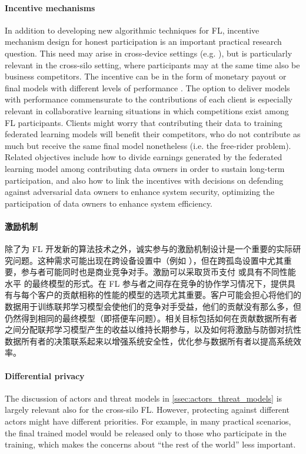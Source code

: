 \paragraph{Incentive mechanisms} In addition to developing new algorithmic techniques for FL, incentive mechanism design for honest participation is an important practical research question. This need may arise in cross-device settings (e.g. \citep{kang19incentive,kang2019incentiveB}), but is particularly relevant in the cross-silo setting, where participants may at the same time also be business competitors. The incentive can be in the form of monetary payout \citep{Yu-et-al:2020IS} or final models with different levels of performance \citep{Lyu-et-al:2020TPDS}. The option to deliver models with performance commensurate to the contributions of each client is especially relevant in collaborative learning situations in which competitions exist among FL participants. Clients might worry that contributing their data to training federated learning models will benefit their competitors, who do not contribute as much but receive the same final model nonetheless (i.e. the free-rider problem). Related objectives include how to divide earnings generated by the federated learning model among contributing data owners in order to sustain long-term participation, and also how to link the incentives with decisions on defending against adversarial data owners to enhance system security, optimizing the participation of data owners to enhance system efficiency.

\paragraph{激励机制} 除了为 FL 开发新的算法技术之外，诚实参与的激励机制设计是一个重要的实际研究问题。这种需求可能出现在跨设备设置中（例如 \citep{kang19incentive,kang2019incentiveB}），但在跨孤岛设置中尤其重要，参与者可能同时也是商业竞争对手。激励可以采取货币支付\citep{Yu-et-al:2020IS} 或具有不同性能水平\citep{Lyu-et-al:2020TPDS} 的最终模型的形式。在 FL 参与者之间存在竞争的协作学习情况下，提供具有与每个客户的贡献相称的性能的模型的选项尤其重要。客户可能会担心将他们的数据用于训练联邦学习模型会使他们的竞争对手受益，他们的贡献没有那么多，但仍然得到相同的最终模型（即搭便车问题）。相关目标包括如何在贡献数据所有者之间分配联邦学习模型产生的收益以维持长期参与，以及如何将激励与防御对抗性数据所有者的决策联系起来以增强系统安全性，优化参与数据所有者以提高系统效率。

\paragraph{Differential privacy} The discussion of actors and threat models in \cref{ssec:actors_threat_models} is largely relevant also for the cross-silo FL. However, protecting against different actors might have different priorities. For example, in many practical scenarios, the final trained model would be released only to those who participate in the training, which makes the concerns about ``the rest of the world'' less important. 

